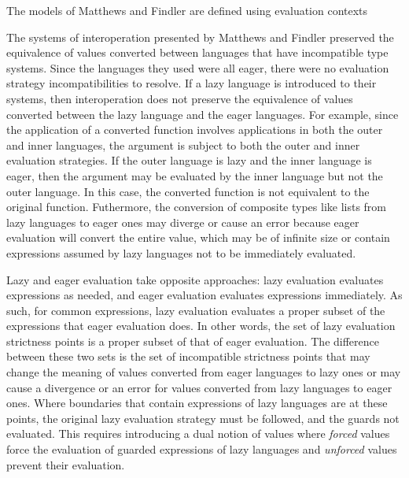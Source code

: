 The models of Matthews and Findler are defined using evaluation contexts

The systems of interoperation presented by Matthews and Findler \cite{matthews07} preserved the equivalence of values converted between languages that have incompatible type systems. Since the languages they used were all eager, there were no evaluation strategy incompatibilities to resolve. If a lazy language is introduced to their systems, then interoperation does not preserve the equivalence of values converted between the lazy language and the eager languages. For example, since the application of a converted function involves applications in both the outer and inner languages, the argument is subject to both the outer and inner evaluation strategies. If the outer language is lazy and the inner language is eager, then the argument may be evaluated by the inner language but not the outer language. In this case, the converted function is not equivalent to the original function. Futhermore, the conversion of composite types like lists from lazy languages to eager ones may diverge or cause an error because eager evaluation will convert the entire value, which may be of infinite size or contain expressions assumed by lazy languages not to be immediately evaluated.

Lazy and eager evaluation take opposite approaches: lazy evaluation evaluates expressions as needed, and eager evaluation evaluates expressions immediately. As such, for common expressions, lazy evaluation evaluates a proper subset of the expressions that eager evaluation does. In other words, the set of lazy evaluation strictness points is a proper subset of that of eager evaluation. The difference between these two sets is the set of incompatible strictness points that may change the meaning of values converted from eager languages to lazy ones or may cause a divergence or an error for values converted from lazy languages to eager ones. Where boundaries that contain expressions of lazy languages are at these points, the original lazy evaluation strategy must be followed, and the guards not evaluated. This requires introducing a dual notion of values where \emph{forced} values force the evaluation of guarded expressions of lazy languages and \emph{unforced} values prevent their evaluation.